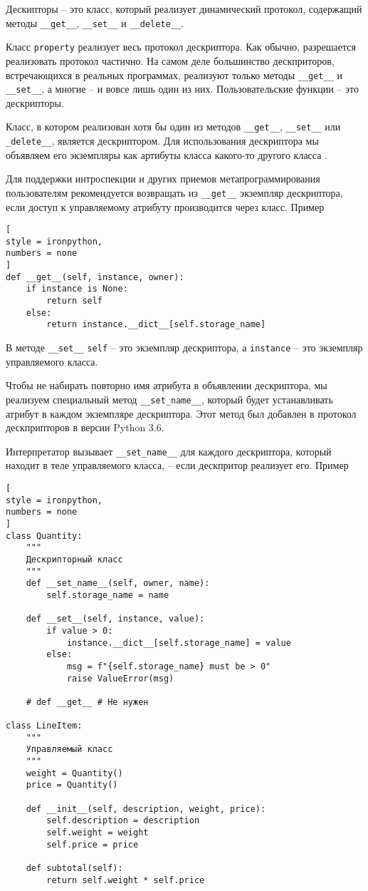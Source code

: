 \documentclass[%
	11pt,
	a4paper,
	utf8,
		]{article}
\begin{document}
Дескипторы -- это класс, который реализует динамический протокол, содержащий методы \verb*|__get__|, \verb|__set__| и \verb*|__delete__|. 

Класс \verb|property| реализует весь протокол дескриптора. Как обычно, разрешается реализовать протокол частично. На самом деле большинство дескприторов, встречающихся в реальных программах, реализуют только методы \verb*|__get__| и \verb*|__set__|, а многие -- и вовсе лишь один из них. Пользовательские функции -- это дескрипторы.

Класс, в котором реализован хотя бы один из методов \verb|__get__|, \verb*|__set__| или \verb|_delete__|, является дескриптором. Для использования дескриптора мы объявляем его экземпляры как артибуты класса какого-то другого класса \cite[]{ramalho:python-2022}.

Для поддержки интроспекции и других приемов метапрограммирования пользователям рекомендуется возвращать из \verb|__get__| экземпляр дескриптора, если доступ к управляемому атрибуту производится через класс. Пример \cite[]{ramalho:python-2022}
\begin{lstlisting}[
style = ironpython,
numbers = none
]
def __get__(self, instance, owner):
    if instance is None:
        return self
    else:
        return instance.__dict__[self.storage_name]
\end{lstlisting}

В методе \verb*|__set__| \verb|self| -- это экземпляр дескриптора, а \verb*|instance| -- это экземпляр управляемого класса.

Чтобы не набирать повторно имя атрибута в объявлении дескриптора, мы реализуем специальный метод \verb|__set_name__|, который будет устанавливать атрибут в каждом экземпляре дескриптора. Этот метод был добавлен в протокол дескприпторов в версии Python 3.6.

Интерпретатор вызывает \verb*|__set_name__| для каждого дескриптора, который находит в теле управляемого класса, -- если дескпритор реализует его. Пример
\begin{lstlisting}[
style = ironpython,
numbers = none
]
class Quantity:
    """
    Дескрипторный класс
    """
    def __set_name__(self, owner, name):
        self.storage_name = name
    
    def __set__(self, instance, value):
        if value > 0:
            instance.__dict__[self.storage_name] = value
        else:
            msg = f"{self.storage_name} must be > 0"
            raise ValueError(msg)
            
    # def __get__ # Не нужен
    
class LineItem:
    """
    Управляемый класс
    """
    weight = Quantity()
    price = Quantity()
    
    def __init__(self, description, weight, price):
        self.description = description
        self.weight = weight
        self.price = price
        
    def subtotal(self):
        return self.weight * self.price
\end{lstlisting}
\end{document}
